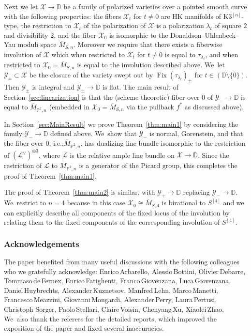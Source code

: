 \documentclass[11pt]{article}
\newcommand{\ie}{i.e.,\xspace}
\newcommand{\HK}{\textup{HK}\xspace}
\newcommand{\DD}{{\mathbb D}}
\newcommand{\PP}{{\mathbb P}}\let\P\PP
\newcommand\cL{\mathcal{L}}
\newcommand\cX{\mathcal{X}}
\newcommand\cY{\mathcal{Y}}
\DeclareMathOperator{\Fix}{Fix}
\let\ov\overline
\theoremstyle{definition}
\begin{document}
Next we let $\cX\to\DD$ be a family of polarized varieties over a pointed smooth curve with the following properties: the fibers $\cX_t$ for $t\not=0$ are \HK manifolds of K3$^{[n]}$-type, the restriction to $\cX_t$ of the polarization of $\cX$ is a polarization $\lambda_t$ of square $2$ and divisibility $2$, and the fiber $\cX_0$ is isomorphic to the Donaldson--Uhlenbeck--Yau moduli space $\ov{M}_{S,n}$.
Moreover we require that there exists a fiberwise involution of $\cX$ which when restricted to $\cX_t$ for $t\not=0$ is equal to $\tau_{\lambda_t}$, and when restricted to $\cX_0=\ov{M}_{S,n}$ is equal to the involution described above. We~let $\cY_{\pm}\subset\cX$ be the closure of the variety swept out by $\Fix(\tau_{\lambda_t})_{\pm}$ for $t\in(\DD\setminus\{0\})$.
Then $\cY_{\pm}$ is integral and $\cY_{\pm}\to\DD$ is flat.
The main result of Section~\ref{sec:linearization} is that the (scheme theoretic) fiber over $0$ of $\cY_{-}\to\DD$ is equal to $\ov{M}_{\PP^2,n}$ (embedded in $\cX_0=\ov{M}_{S,n}$ via the pullback $f^*$ as discussed above).

In Section~\ref{sec:MainResult} we prove Theorem~\ref{thm:main1} by considering the family $\cY_{-}\to\DD$ defined above. We~show that $\cY_{-}$ is normal, Gorenstein, and that the fiber over $0$, \ie $\ov{M}_{\PP^2,n}$, has dualizing line bundle isomorphic to the restriction of $(\cL^{\vee})^{\otimes 3}$, where $\cL$ is the relative ample line bundle on $\cX\to\DD$.
Since the restriction of $\cL$ to $\ov{M}_{\PP^2,n}$ is a generator of the Picard group, this completes the proof of Theorem~\ref{thm:main1}.

The proof of Theorem~\ref{thm:main2} is similar, with $\cY_{+}\to\DD$ replacing $\cY_{-}\to\DD$. We~restrict to $n=4$ because in this case $\cX_0\cong \ov{M}_{S,4}$ is birational to $S^{[4]}$ and we can explicitly describe all components of the fixed locus of the involution by relating them to the fixed components of the corresponding involution of $S^{[4]}$.

\subsubsection*{Acknowledgements}
The paper benefited from many useful discussions with the following colleagues who we gratefully acknowledge: Enrico\,Arbarello, Alessio\,\hbox{Bottini}, Olivier\,Debarre, Tommaso\,de\,Fernex, Enrico\,Fatighenti, Franco\,Giovenzana, Luca\,Gio\-ven\-zana, Daniel\,Huybrechts, Alexander\,Kuznetsov, Manfred\,Lehn, Marco\,Manetti, Francesco\,Meazzini, Giovanni\,Mongardi, Alexander\,Perry, Laura\,Pertusi, Christoph Sorger, Paolo\,Stellari, Claire\,Voisin, Chenyang\,Xu, Xiaolei\,Zhao. We~also thank the referees for the detailed reports, which improved the exposition of the paper and fixed several inaccuracies.
\end{document}
